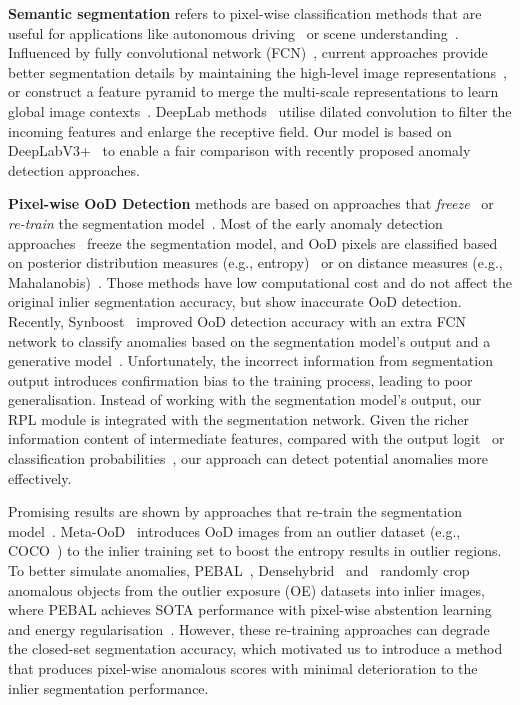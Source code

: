 \documentclass[10pt,twocolumn,letterpaper]{article}
\begin{document}
\noindent \textbf{Semantic segmentation} refers to pixel-wise classification methods that are useful for applications like autonomous driving~\cite{hao2020brief,yurtsever2020survey} or scene understanding~\cite{hong2022goss}.
Influenced by fully convolutional network (FCN)~\cite{long2015fully}, current approaches provide better segmentation details by maintaining the high-level image representations~\cite{yuan2020object, ronneberger2015u, krevso2020efficient}, or construct a feature pyramid to merge the multi-scale representations to learn global image contexts~\cite{lin2017feature, zhao2017pyramid}.
DeepLab methods~\cite{chen2017deeplab,chen2017rethinking,chen2018encoder} utilise dilated convolution to filter the incoming features and enlarge the receptive field. 
Our model is based on  DeepLabV3+~\cite{chen2018encoder} to enable a fair comparison with recently proposed anomaly detection approaches.

\noindent\textbf{Pixel-wise OoD Detection}
methods are based on approaches that
\textit{freeze}~\cite{jung2021standardized,di2021pixel} or \textit{re-train} the segmentation model~\cite{tian2021pixel,chan2021entropy,grcic2022densehybrid}. 
Most of the early anomaly detection approaches~\cite{mukhoti2018evaluating} freeze the segmentation model, and OoD pixels are classified based on posterior distribution measures (e.g., entropy)~\cite{hendrycks2016baseline, lakshminarayanan2017simple}  or on distance measures (e.g., Mahalanobis)~\cite{lee2018simple}. Those methods have low computational cost and do not affect the original inlier segmentation accuracy, but show inaccurate OoD detection. Recently, Synboost~\cite{di2021pixel} improved OoD detection accuracy with an extra FCN network to classify anomalies based on the segmentation model's output and a generative model~\cite{wang2018high}. Unfortunately, the incorrect information from segmentation output introduces confirmation bias to the training process, leading to poor generalisation. 
Instead of working with the segmentation model's output, our RPL module is integrated with the segmentation network. 
Given the richer information content of  intermediate features, compared with the output logit~\cite{di2021pixel} or classification probabilities~\cite{mukhoti2018evaluating}, our approach can detect potential anomalies more effectively. 


Promising results are shown by approaches that re-train the segmentation model~\cite{hendrycks2018deep}. 
Meta-OoD~\cite{chan2021entropy} introduces OoD images from an outlier dataset (e.g., COCO~\cite{lin2014microsoft}) to the inlier training set to boost the entropy results in outlier regions. To better simulate anomalies, PEBAL~\cite{tian2021pixel}, Densehybrid~\cite{grcic2022densehybrid} and~\cite{bevandic2019simultaneous} randomly crop anomalous objects from the outlier exposure (OE) datasets into inlier images, where PEBAL achieves SOTA performance with pixel-wise abstention learning~\cite{liu2019deep} and energy regularisation~\cite{liu2020energy}. However, these re-training approaches can degrade the closed-set segmentation accuracy, which motivated us to introduce a method 
that produces pixel-wise anomalous scores with minimal deterioration to the inlier segmentation performance.
\end{document}
